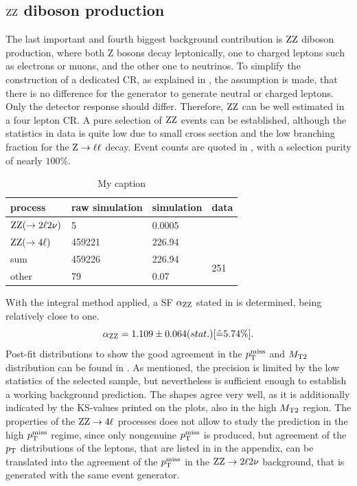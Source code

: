 \subsection{$\mathrm{Z}\mathrm{Z}$ diboson production}
The last important and fourth biggest background contribution is $\mathrm{Z}\mathrm{Z}$ diboson production, where both Z bosons decay leptonically, one to charged leptons such as electrons or muons, and the other one to neutrinos. To simplify the construction of a dedicated CR, as explained in , the assumption is made, that there is no difference for the generator to generate neutral or charged leptons. Only the detector response should differ. Therefore, $\mathrm{Z}\mathrm{Z}$ can be well estimated in a four lepton CR. A pure selection of $\mathrm{Z}\mathrm{Z}$ events can be established, although the statistics in data is quite low due to small cross section and the low branching fraction for the $\mathrm{Z}\to\ell\ell$ decay. Event counts are quoted in , with a selection purity of nearly $100\%$.
\begin{table}[tbp]
 \centering
 \caption{My caption}
 \label{tab:CRZZ}
 \begin{tabular}{llll}
  
  process                 & raw simulation & simulation & data                 \\\hline
  $\mathrm{Z}\mathrm{Z}(\to2\ell2\nu)$ & 5              & 0.0005     &                      \\
  $\mathrm{Z}\mathrm{Z}(\to4\ell)$      & 459221         & 226.94     &                      \\\hline\hline
  sum                     & 459226         & 226.94     & \multirow{2}{*}{251} \\
  other                   & 79             & 0.07       &                      
 \end{tabular}
\end{table}
With the integral method applied, a SF $\alpha_{\mathrm{Z}\mathrm{Z}}$ stated in  is determined, being relatively close to one.
\begin{equation}\label{eq:AlphaZZ}
 \alpha_{\mathrm{Z}\mathrm{Z}}=1.109 \pm 0.064 (stat.) [\hat{=}5.74\%].
\end{equation}
Post-fit distributions to show the good agreement in the $p_{\mathrm{T}}^\text{miss}$ and $M_{\mathrm{T2}}$ distribution can be found in . As mentioned, the precision is limited by the low statistics of the selected sample, but nevertheless is sufficient enough to establish a working background prediction. The shapes agree very well, as it is additionally indicated by the KS-values printed on the plots, also in the high $M_{\mathrm{T2}}$ region. The properties of the $\mathrm{Z}\mathrm{Z}\to4\ell$ processes does not allow to study the prediction in the high $p_{\mathrm{T}}^\text{miss}$ regime, since only nongenuine $p_{\mathrm{T}}^\text{miss}$ is produced, but agreement of the $p_{\mathrm{T}}$ distributions of the leptons, that are listed in  in the appendix, can be translated into the agreement of the $p_{\mathrm{T}}^\text{miss}$ in the $\mathrm{Z}\mathrm{Z}\to2\ell2\nu$ background, that is generated with the same event generator.
